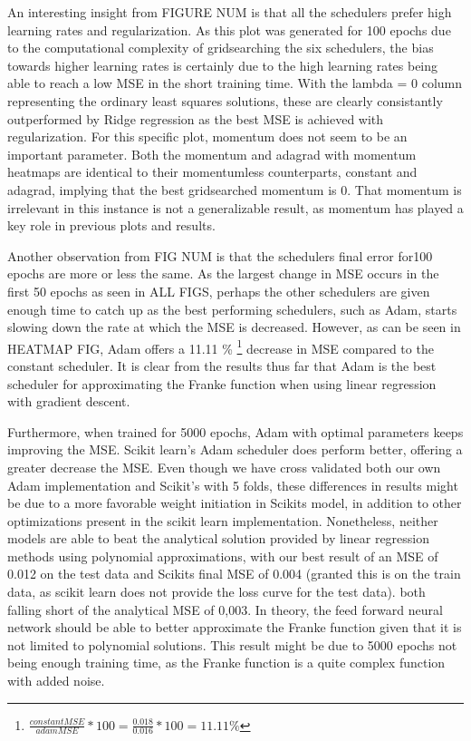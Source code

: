 \documentclass[onecolumn,10pt,cleanfoot]{asme2ej}
\begin{document}
An interesting insight from FIGURE NUM is that all the schedulers prefer high learning rates and regularization. As this plot was generated for 100 epochs due to the computational complexity of gridsearching the six schedulers, the bias towards higher learning rates is certainly due to the high learning rates being able to reach a low MSE in the short training time. With the lambda = 0 column representing the ordinary least squares solutions, these are clearly consistantly outperformed by Ridge regression as the best MSE is achieved with regularization. For this specific plot, momentum does not seem to be an important parameter. Both the momentum and adagrad with momentum heatmaps are identical to their momentumless counterparts, constant and adagrad, implying that the best gridsearched momentum is 0. That momentum is irrelevant in this instance is not a generalizable result, as momentum has played a key role in previous plots and results.

Another observation from FIG NUM  is that the schedulers final error for100 epochs are more or less the same. As the largest change in MSE occurs in the first 50 epochs as seen in ALL FIGS, perhaps the other schedulers are given enough time to catch up as the best performing schedulers, such as Adam, starts slowing down the rate at which the MSE is decreased. However, as can be seen in HEATMAP FIG, Adam offers a 11.11 \% \footnote{$\frac{constant MSE}{adam MSE} * 100 = \frac{0.018}{0.016} * 100 = 11.11\%$} decrease in MSE compared to the constant scheduler. It is clear from the results thus far that Adam is the best scheduler for approximating the Franke function when using linear regression with gradient descent.

Furthermore, when trained for 5000 epochs, Adam with optimal parameters keeps improving the MSE. Scikit learn's Adam scheduler does perform better, offering a greater decrease the MSE. Even though we have cross validated both our own Adam implementation and Scikit's with 5 folds, these differences in results might be due to a more favorable weight initiation in Scikits model, in addition to other optimizations present in the scikit learn implementation. Nonetheless, neither models are able to beat the analytical solution provided by linear regression methods using polynomial approximations, with our best result of an MSE of 0.012 on the test data and Scikits final MSE of 0.004 (granted this is on the train data, as scikit learn does not provide the loss curve for the test data).  both falling short of the analytical MSE of 0,003. In theory, the feed forward neural network should be able to better approximate the Franke function given that it is not limited to polynomial solutions. This result might be due to 5000 epochs not being enough training time, as the Franke function is a quite complex function with added noise.
\end{document}
